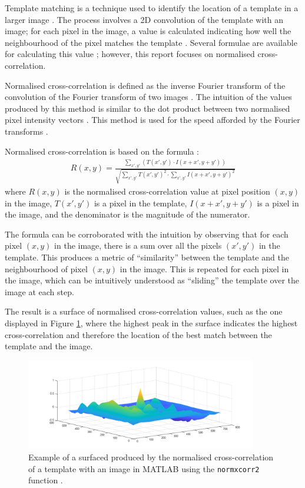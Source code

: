 Template matching is a technique used to identify the location of a template in a larger image \cite{opencv_tm}. The process involves a 2D convolution of the template with an image; for each pixel in the image, a value is calculated indicating how well the neighbourhood of the pixel matches the template \cite{opencv_tm}. Several formulae are available for calculating this value \cite{opencv_tm}; however, this report focuses on normalised cross-correlation.

Normalised cross-correlation is defined as the inverse Fourier transform of the convolution of the Fourier transform of two images \cite{psi_2016}. The intuition of the values produced by this method is similar to the dot product between two normalised pixel intensity vectors \cite{psi_2016}. This method is used for the speed afforded by the Fourier transforms \cite{psi_2016}.

Normalised cross-correlation is based on the formula \cite{opencv_tm}:
\begin{align}
  R(x,y) = \frac{\sum_{x',y'}\left(T(x',y')\cdot I(x+x',y+y')\right)}{\sqrt{\sum_{x',y'} T(x',y')^2 \cdot \sum_{x',y'} I(x+x',y+y')^2}}
\end{align}
where $R(x,y)$ is the normalised cross-correlation value at pixel position $(x,y)$ in the image, $T(x',y')$ is a pixel in the template, $I(x+x', y+y')$ is a pixel in the image, and the denominator is the magnitude of the numerator.

The formula can be corroborated with the intuition by observing that for each pixel $(x,y)$ in the image, there is a sum over all the pixels $(x',y')$ in the template. This produces a metric of ``similarity'' between the template and the neighbourhood of pixel $(x,y)$ in the image. This is repeated for each pixel in the image, which can be intuitively understood as ``sliding'' the template over the image at each step.

The result is a surface of normalised cross-correlation values, such as the one displayed in Figure \ref{fig:normxcorr2}, where the highest peak in the surface indicates the highest cross-correlation and therefore the location of the best match between the template and the image.

\begin{figure}[ht]
  \centering
  \includegraphics[width=0.9\textwidth]{images/normxcorr2_surface.png}
  \caption{Example of a surfaced produced by the normalised cross-correlation of a template with an image in MATLAB using the \texttt{normxcorr2} function \cite{mathworks_normxcorr2}.}
  \label{fig:normxcorr2}
\end{figure}


